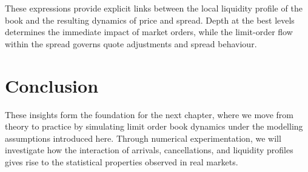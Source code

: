 These expressions provide explicit links between the local liquidity profile of the book and
the resulting dynamics of price and spread. Depth at the best levels determines the
immediate impact of market orders, while the limit-order flow within the spread governs
quote adjustments and spread behaviour.

\section{Conclusion}

These insights form the foundation for the next chapter, where we move from theory to
practice by simulating limit order book dynamics under the modelling assumptions
introduced here. Through numerical experimentation, we will investigate how the
interaction of arrivals, cancellations, and liquidity profiles gives rise to the statistical
properties observed in real markets.

